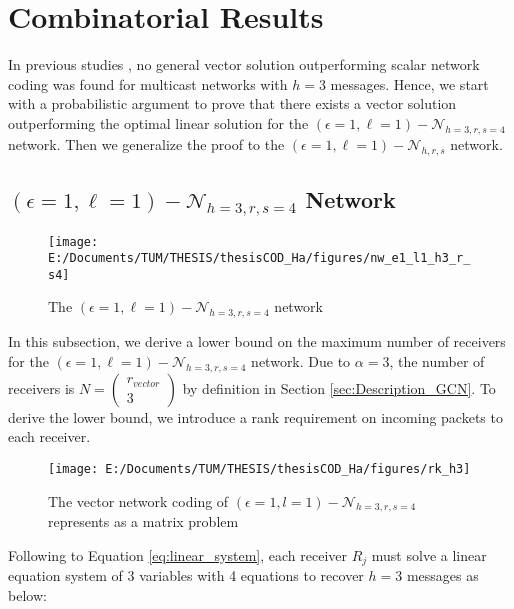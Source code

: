 \chapter{Combinatorial Results} \label{chap:comb_res}

In previous studies \cite{Wachter-Zeh:2018}, no general vector solution
outperforming scalar network coding was found for multicast networks
with $h=3$ messages. Hence, we start with a probabilistic argument
to prove that there exists a vector solution outperforming the optimal
linear solution for the $\left(\epsilon=1,\ell=1\right)-\mathcal{N}_{h=3,r,s=4}$
network. Then we generalize the proof to the $\left(\epsilon=1,\ell=1\right)-\mathcal{N}_{h,r,s}$
network.

\section{$\left(\epsilon=1,\ell=1\right)-\mathcal{N}_{h=3,r,s=4}$ Network
\label{sec:Network_e1l1h3rs4}}

\begin{figure}[H]
\caption{The $(\epsilon=1,\ell=1)-\mathcal{N}_{h=3,r,s=4}$ network\label{fig:nw_e1_l1_h3_r_s4}}

\centering{}\texttt{[image: E:/Documents/TUM/THESIS/thesisCOD\_Ha/figures/nw\_e1\_l1\_h3\_r\_s4]}
\end{figure}

In this subsection, we derive a lower bound on the maximum number
of receivers for the $\left(\epsilon=1,\ell=1\right)-\mathcal{N}_{h=3,r,s=4}$
network. Due to $\alpha=3$, the number of receivers is $N=\left(\begin{array}{c}
r_{vector}\\
3
\end{array}\right)$ by definition in Section \ref{sec:Description_GCN}. To derive the
lower bound, we introduce a rank requirement on incoming packets to
each receiver. 

\begin{figure}[H]
\caption{The vector network coding of $(\epsilon=1,l=1)-\mathcal{N}_{h=3,r,s=4}$
represents as a matrix problem\label{fig:rk_h3}}

\centering{}\texttt{[image: E:/Documents/TUM/THESIS/thesisCOD\_Ha/figures/rk\_h3]}
\end{figure}

Following to Equation \ref{eq:linear_system}, each receiver $R_{j}$
must solve a linear equation system of 3 variables with 4 equations
to recover $h=3$ messages as below:

